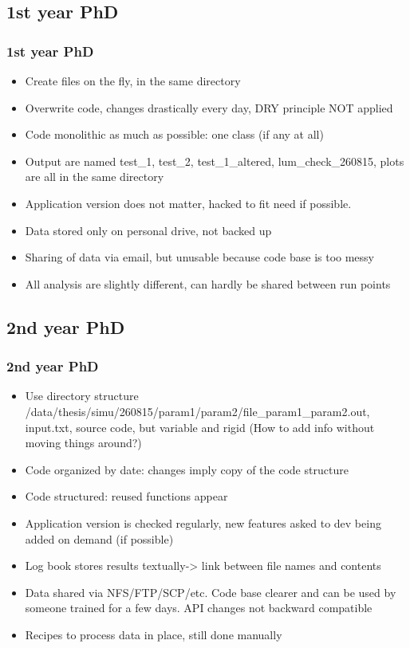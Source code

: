\documentclass[14pt]{beamer}
\begin{document}
\subsection{1st year PhD}
\begin{frame}
\frametitle{1st year PhD}
\begin{itemize}
\item Create files on the fly, in the same directory
\item Overwrite code, changes drastically every day, DRY principle NOT applied
\item Code monolithic as much as possible: one class (if any at all)
\item Output are named test\_1, test\_2, test\_1\_altered, lum\_check\_260815, plots are all in the same directory
\end{itemize}
\end{frame}

\begin{frame}
\begin{itemize}
\item Application version does not matter, hacked to fit need if possible.
\item Data stored only on personal drive, not backed up
\item Sharing of data via email, but unusable because code base is too messy
\item All analysis are slightly different, can hardly be shared between run points
\end{itemize}
\end{frame}
\subsection{2nd year PhD}
\begin{frame}
\frametitle{2nd year PhD}
\begin{itemize}
\item Use directory structure\\ /data/thesis/simu/260815/param1/param2/file\_param1\_param2.out, input.txt, source code, but variable and rigid (How to add info without moving things around?)
\item Code organized by date: changes imply copy of the code structure
\item Code structured: reused functions appear
\item Application version is checked regularly, new features asked to dev being added on demand (if possible)
\end{itemize}
\end{frame}
\begin{frame}
\begin{itemize}
\item Log book stores results textually-> link between file names and contents
\item Data shared via NFS/FTP/SCP/etc. Code base clearer and can be used by someone trained for a few days. API changes not backward compatible
\item Recipes to process data in place, still done manually
\end{itemize}
\end{frame}
\end{document}

